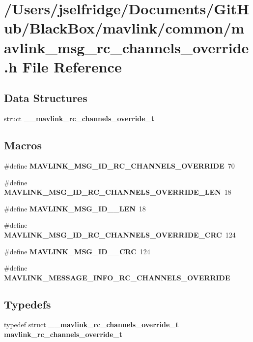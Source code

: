 \section{/\+Users/jselfridge/\+Documents/\+Git\+Hub/\+Black\+Box/mavlink/common/mavlink\+\_\+msg\+\_\+rc\+\_\+channels\+\_\+override.h File Reference}
\label{mavlink__msg__rc__channels__override_8h}
\subsection*{Data Structures}
\begin{DoxyCompactItemize}
\item 
struct \textbf{ \+\_\+\+\_\+mavlink\+\_\+rc\+\_\+channels\+\_\+override\+\_\+t}
\end{DoxyCompactItemize}
\subsection*{Macros}
\begin{DoxyCompactItemize}
\item 
\#define \textbf{ M\+A\+V\+L\+I\+N\+K\+\_\+\+M\+S\+G\+\_\+\+I\+D\+\_\+\+R\+C\+\_\+\+C\+H\+A\+N\+N\+E\+L\+S\+\_\+\+O\+V\+E\+R\+R\+I\+DE}~70
\item 
\#define \textbf{ M\+A\+V\+L\+I\+N\+K\+\_\+\+M\+S\+G\+\_\+\+I\+D\+\_\+\+R\+C\+\_\+\+C\+H\+A\+N\+N\+E\+L\+S\+\_\+\+O\+V\+E\+R\+R\+I\+D\+E\+\_\+\+L\+EN}~18
\item 
\#define \textbf{ M\+A\+V\+L\+I\+N\+K\+\_\+\+M\+S\+G\+\_\+\+I\+D\+\_\+\_\+\+L\+EN}~18
\item 
\#define \textbf{ M\+A\+V\+L\+I\+N\+K\+\_\+\+M\+S\+G\+\_\+\+I\+D\+\_\+\+R\+C\+\_\+\+C\+H\+A\+N\+N\+E\+L\+S\+\_\+\+O\+V\+E\+R\+R\+I\+D\+E\+\_\+\+C\+RC}~124
\item 
\#define \textbf{ M\+A\+V\+L\+I\+N\+K\+\_\+\+M\+S\+G\+\_\+\+I\+D\+\_\+\_\+\+C\+RC}~124
\item 
\#define \textbf{ M\+A\+V\+L\+I\+N\+K\+\_\+\+M\+E\+S\+S\+A\+G\+E\+\_\+\+I\+N\+F\+O\+\_\+\+R\+C\+\_\+\+C\+H\+A\+N\+N\+E\+L\+S\+\_\+\+O\+V\+E\+R\+R\+I\+DE}
\end{DoxyCompactItemize}
\subsection*{Typedefs}
\begin{DoxyCompactItemize}
\item 
typedef struct \textbf{ \+\_\+\+\_\+mavlink\+\_\+rc\+\_\+channels\+\_\+override\+\_\+t} \textbf{ mavlink\+\_\+rc\+\_\+channels\+\_\+override\+\_\+t}
\end{DoxyCompactItemize}


